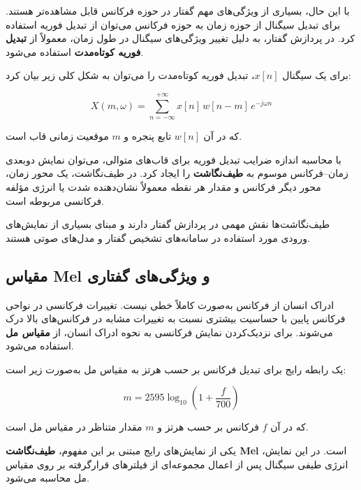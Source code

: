 با این حال، بسیاری از ویژگی‌های مهم گفتار در حوزه فرکانس
قابل مشاهده‌تر هستند.
برای تبدیل سیگنال از حوزه زمان به حوزه فرکانس می‌توان از
تبدیل فوریه استفاده کرد.
در پردازش گفتار، به دلیل تغییر ویژگی‌های سیگنال در طول زمان،
معمولاً از
\textbf{تبدیل فوریه کوتاه‌مدت}
استفاده می‌شود.

برای یک سیگنال $x[n]$، تبدیل فوریه کوتاه‌مدت را می‌توان به
شکل کلی زیر بیان کرد:

\begin{equation}
X(m,\omega)
=
\sum_{n=-\infty}^{+\infty}
x[n]\,w[n-m]\,e^{-j\omega n}
\end{equation}

که در آن $w[n]$ تابع پنجره و $m$ موقعیت زمانی قاب است.

با محاسبه اندازه ضرایب تبدیل فوریه برای قاب‌های متوالی،
می‌توان نمایش دوبعدی زمان--فرکانس موسوم به
\textbf{طیف‌نگاشت}
را ایجاد کرد.
در طیف‌نگاشت، یک محور زمان، محور دیگر فرکانس و مقدار هر نقطه
معمولاً نشان‌دهنده شدت یا انرژی مؤلفه فرکانسی مربوطه است.

طیف‌نگاشت‌ها نقش مهمی در پردازش گفتار دارند و مبنای بسیاری از
نمایش‌های ورودی مورد استفاده در سامانه‌های تشخیص گفتار و
مدل‌های صوتی هستند.


\subsection{مقیاس Mel و ویژگی‌های گفتاری}

ادراک انسان از فرکانس به‌صورت کاملاً خطی نیست.
تغییرات فرکانسی در نواحی فرکانس پایین با حساسیت بیشتری نسبت
به تغییرات مشابه در فرکانس‌های بالا درک می‌شوند.
برای نزدیک‌کردن نمایش فرکانسی به نحوه ادراک انسان، از
\textbf{مقیاس مل}
استفاده می‌شود.

یک رابطه رایج برای تبدیل فرکانس بر حسب هرتز به مقیاس مل
به‌صورت زیر است:

\begin{equation}
m
=
2595
\log_{10}
\left(
1+\frac{f}{700}
\right)
\end{equation}

که در آن $f$ فرکانس بر حسب هرتز و $m$ مقدار متناظر در مقیاس
مل است.

یکی از نمایش‌های رایج مبتنی بر این مفهوم،
\textbf{طیف‌نگاشت Mel}
است.
در این نمایش، انرژی طیفی سیگنال پس از اعمال مجموعه‌ای از
فیلترهای قرارگرفته بر روی مقیاس مل محاسبه می‌شود.

